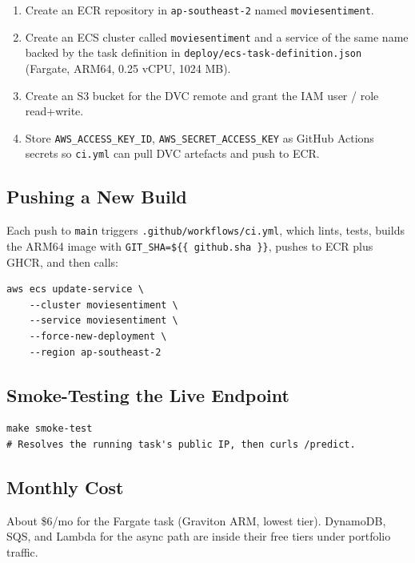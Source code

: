 \documentclass[11pt,a4paper]{article}
\begin{document}
\begin{enumerate}[leftmargin=*]
\item Create an ECR repository in \texttt{ap-southeast-2} named
      \texttt{moviesentiment}.
\item Create an ECS cluster called \texttt{moviesentiment} and a service of the
      same name backed by the task definition in
      \texttt{deploy/ecs-task-definition.json} (Fargate, ARM64, 0.25 vCPU,
      1024 MB).
\item Create an S3 bucket for the DVC remote and grant the IAM user / role
      read+write.
\item Store \texttt{AWS\_ACCESS\_KEY\_ID}, \texttt{AWS\_SECRET\_ACCESS\_KEY} as
      GitHub Actions secrets so \texttt{ci.yml} can pull DVC artefacts and push to
      ECR.
\end{enumerate}

\subsection{Pushing a New Build}

Each push to \texttt{main} triggers \texttt{.github/workflows/ci.yml}, which lints,
tests, builds the ARM64 image with \texttt{GIT\_SHA=\$\{\{ github.sha \}\}}, pushes
to ECR plus GHCR, and then calls:

\begin{lstlisting}
aws ecs update-service \
    --cluster moviesentiment \
    --service moviesentiment \
    --force-new-deployment \
    --region ap-southeast-2
\end{lstlisting}

\subsection{Smoke-Testing the Live Endpoint}

\begin{lstlisting}
make smoke-test
# Resolves the running task's public IP, then curls /predict.
\end{lstlisting}

\subsection{Monthly Cost}

About \$6/mo for the Fargate task (Graviton ARM, lowest tier). DynamoDB, SQS, and
Lambda for the async path are inside their free tiers under portfolio traffic.

\end{document}
